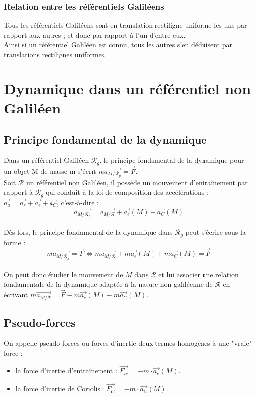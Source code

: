 \documentclass[a4paper,10pt]{book} %
\begin{document}
\subsubsection{Relation entre les référentiels Galiléens}
Tous les référentiels Galiléens sont en translation rectiligne uniforme les uns par rapport aux autres ; et donc par rapport à l’un d’entre eux.\\

Ainsi si un référentiel Galiléen est connu, tous les autres s’en déduisent par translations rectilignes uniformes.


\section{Dynamique dans un référentiel non Galiléen}
\subsection{Principe fondamental de la dynamique}
Dans un référentiel Galiléen $\mathcal{R}_g$, le principe fondamental de la dynamique pour un objet M de masse m s'écrit $m\overrightarrow{a_{M/\mathcal{R}_g}}=\overrightarrow{F}$.\\

Soit $\mathcal{R}$ un référentiel non Galiléen, il possède un mouvement d'entraînement par rapport à $\mathcal{R}_g$ qui conduit à la loi de composition des accélérations : $\overrightarrow{a_a}=\overrightarrow{a_r}+\overrightarrow{a_e}+\overrightarrow{a_C}$, c'est-à-dire :
$$\overrightarrow{a_{M/\mathcal{R}_g}}=\overrightarrow{a_{M/\mathcal{R}}}+\overrightarrow{a_e}(M)+\overrightarrow{a_C}(M)$$\\
Dès lors, le principe fondamental de la dynamique dans $\mathcal{R}_g$ peut s'écrire sous la forme :
$$m\overrightarrow{a_{M/\mathcal{R}_g}}=\overrightarrow{F} \Leftrightarrow m\overrightarrow{a_{M/\mathcal{R}}}+m\overrightarrow{a_e}(M)+m\overrightarrow{a_C}(M)=\overrightarrow{F}$$\\
On peut donc étudier le mouvement de $M$ dans $\mathcal{R}$ et lui associer une relation fondamentale de la dynamique adaptée à la nature non galiléenne de $\mathcal{R}$ en écrivant
$m\overrightarrow{a_{M/\mathcal{R}}}=\overrightarrow{F}-m\overrightarrow{a_e}(M)-m\overrightarrow{a_C}(M)$.

\subsection{Pseudo-forces}
On appelle pseudo-forces ou forces d'inertie deux termes homogènes à une "vraie" force :
\begin{itemize}
\item la force d'inertie d'entraînement : $\overrightarrow{F_{ie}}=-m\cdot\overrightarrow{a_e}(M)$.
\item la force d'inertie de Coriolis : $\overrightarrow{F_C}=-m\cdot \overrightarrow{a_C}(M)$.
\end{itemize}
\end{document}
